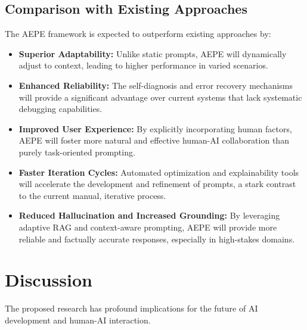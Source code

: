 \documentclass{article}
\begin{document}
\subsection{Comparison with Existing Approaches}
The AEPE framework is expected to outperform existing approaches by:
\begin{itemize}
    \item \textbf{Superior Adaptability:} Unlike static prompts, AEPE will dynamically adjust to context, leading to higher performance in varied scenarios.
    \item \textbf{Enhanced Reliability:} The self-diagnosis and error recovery mechanisms will provide a significant advantage over current systems that lack systematic debugging capabilities.
    \item \textbf{Improved User Experience:} By explicitly incorporating human factors, AEPE will foster more natural and effective human-AI collaboration than purely task-oriented prompting.
    \item \textbf{Faster Iteration Cycles:} Automated optimization and explainability tools will accelerate the development and refinement of prompts, a stark contrast to the current manual, iterative process.
\item \textbf{Reduced Hallucination and Increased Grounding:} By leveraging adaptive RAG and context-aware prompting, AEPE will provide more reliable and factually accurate responses, especially in high-stakes domains.
\end{itemize}

\section{Discussion}
The proposed research has profound implications for the future of AI development and human-AI interaction.
\end{document}
